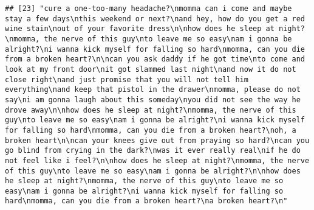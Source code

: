\documentclass[]{article}
\begin{document}
\begin{verbatim}
## [23] "cure a one-too-many headache?\nmomma can i come and maybe stay a few days\nthis weekend or next?\nand hey, how do you get a red wine stain\nout of your favorite dress\n\nhow does he sleep at night?\nmomma, the nerve of this guy\nto leave me so easy\nam i gonna be alright?\ni wanna kick myself for falling so hard\nmomma, can you die from a broken heart?\n\ncan you ask daddy if he got time\nto come and look at my front door\nit got slammed last night\nand now it do not close right\nand just promise that you will not tell him everything\nand keep that pistol in the drawer\nmomma, please do not say\ni am gonna laugh about this someday\nyou did not see the way he drove away\n\nhow does he sleep at night?\nmomma, the nerve of this guy\nto leave me so easy\nam i gonna be alright?\ni wanna kick myself for falling so hard\nmomma, can you die from a broken heart?\noh, a broken heart\n\ncan your knees give out from praying so hard?\ncan you go blind from crying in the dark?\nwas it ever really real\nif he do not feel like i feel?\n\nhow does he sleep at night?\nmomma, the nerve of this guy\nto leave me so easy\nam i gonna be alright?\n\nhow does he sleep at night?\nmomma, the nerve of this guy\nto leave me so easy\nam i gonna be alright?\ni wanna kick myself for falling so hard\nmomma, can you die from a broken heart?\na broken heart?\n"                                                                                                                                                                                                                                                                                                                                                                                                                                                                                                                                                                                                                                                                                                                                                                                                                                                                                                                                                                                                                                                                                                                                                                                                                                                                                                                                                                                                                                                                                                                                                                              

\end{verbatim}
\end{document}
